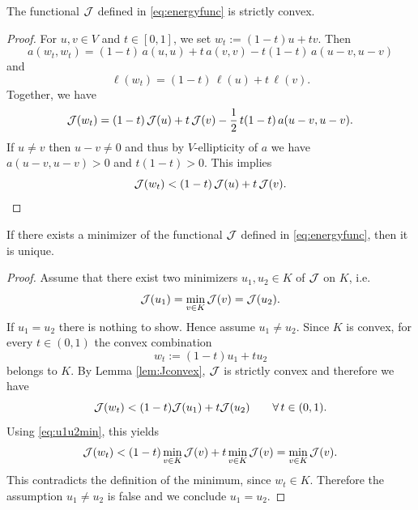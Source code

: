 \begin{lemma}\label{lem:Jconvex}
	The functional ${\mathcal J}$ defined in \eqref{eq:energyfunc} is strictly convex.
\end{lemma}
\begin{proof}
	For $u,v\in V$ and $t\in[0,1]$, we set $w_t:=(1-t)u+tv$. Then
	\begin{equation*}
		a(w_t,w_t) = (1-t)\,a(u,u)+t\,a(v,v)-t(1-t)\,a(u-v,u-v)
	\end{equation*}
	and
	\begin{equation*}
		\ell(w_t) = (1-t)\,\ell(u)+t\,\ell(v).
	\end{equation*}
	Together, we have
	\begin{equation*}
		{\mathcal J}(w_t) = (1-t)\,{\mathcal J}(u)+t\,{\mathcal J}(v)-\frac{1}{2}\,t(1-t)\,a(u-v,u-v).
	\end{equation*}
	If $u\neq v$ then $u-v\neq 0$ and thus by $V$-ellipticity of $a$ we have $a(u-v,u-v)>0$ and $t(1-t)>0$. This implies
	\begin{equation*}
		{\mathcal J}(w_t)<(1-t)\,{\mathcal J}(u)+t\,{\mathcal J}(v).
	\end{equation*}
\end{proof}

\begin{proposition}\label{pr:Junique}
	If there exists a minimizer of the functional ${\mathcal J}$ defined in \eqref{eq:energyfunc}, then it is unique.
\end{proposition}
\begin{proof}
	Assume that there exist two minimizers $u_1,u_2\in K$ of ${\mathcal J}$ on $K$, i.e.
	\begin{equation}\label{eq:u1u2min}
		{\mathcal J}(u_1)=\min_{v\in K}{\mathcal J}(v)={\mathcal J}(u_2).
	\end{equation}
	If $u_1=u_2$ there is nothing to show. Hence assume $u_1\neq u_2$.
	Since $K$ is convex, for every $t\in(0,1)$ the convex combination
	\begin{equation*}
		w_t := (1-t)u_1+tu_2
	\end{equation*}
	belongs to $K$. By Lemma \ref{lem:Jconvex}, ${\mathcal J}$ is strictly convex and therefore we have
	\begin{equation*}
		{\mathcal J}(w_t) < (1-t){\mathcal J}(u_1)+t{\mathcal J}(u_2)\qquad \forall\, t\in(0,1).
	\end{equation*}
	Using \eqref{eq:u1u2min}, this yields
	\begin{equation*}
		{\mathcal J}(w_t) < (1-t)\min_{v\in K}{\mathcal J}(v)+t\min_{v\in K}{\mathcal J}(v)=\min_{v\in K}{\mathcal J}(v).
	\end{equation*}
	This contradicts the definition of the minimum, since $w_t\in K$.
	Therefore the assumption $u_1\neq u_2$ is false and we conclude $u_1=u_2$.
\end{proof}

